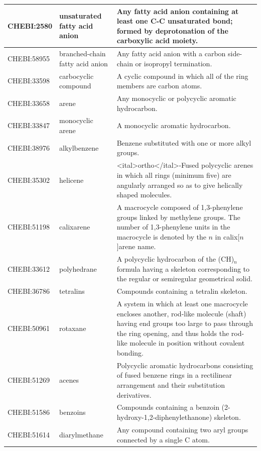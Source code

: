 \documentclass[10pt]{bmc_article}
\newenvironment{bmcformat}{\baselineskip20pt\sloppy\setboolean{publ}{false}}{\baselineskip20pt\sloppy}
\begin{document}
\begin{bmcformat}
{\begin{tabular}{|l|l|p{8cm}|}
CHEBI:2580  &  unsaturated fatty acid anion  &  Any fatty acid anion containing at least one C-C unsaturated bond; formed by deprotonation of the carboxylic acid moiety. \\ \hline
CHEBI:58955  &  branched-chain fatty acid anion  &  Any fatty acid anion with a carbon side-chain or isopropyl termination. \\ \hline
CHEBI:33598  &  carbocyclic compound  &  A cyclic compound in which all of the ring members are carbon atoms.\\ \hline
CHEBI:33658  &  arene  &  Any monocyclic or polycyclic aromatic hydrocarbon. \\ \hline
CHEBI:33847  &  monocyclic arene  &  A monocyclic aromatic hydrocarbon. \\ \hline
CHEBI:38976  &  alkylbenzene  &  Benzene substituted with one or more alkyl groups. \\ \hline
CHEBI:35302  &  helicene  &  <ital>ortho</ital>-Fused polycyclic arenes in which all rings (minimum five) are angularly arranged so as to give helically shaped molecules. \\ \hline
CHEBI:51198  &  calixarene  &  A macrocycle composed of 1,3-phenylene groups linked by methylene groups. The number of 1,3-phenylene units in the macrocycle is denoted by the $n$ in calix[$n$]arene name. \\ \hline
CHEBI:33612  &  polyhedrane  &  A polycyclic hydrocarbon of the (CH)$_n$ formula having a skeleton corresponding to the regular or semiregular geometrical solid. \\ \hline
CHEBI:36786  &  tetralins  &  Compounds containing a tetralin skeleton.\\ \hline
CHEBI:50961  &  rotaxane  &  A system in which at least one macrocycle encloses another, rod-like molecule (shaft) having end groups too large to pass through the ring opening, and thus holds the rod-like molecule in position without covalent bonding. \\ \hline
CHEBI:51269  &  acenes  &  Polycyclic aromatic hydrocarbons consisting of fused benzene rings in a rectilinear arrangement and their substitution derivatives. \\ \hline
CHEBI:51586  &  benzoins  &  Compounds containing a benzoin (2-hydroxy-1,2-diphenylethanone) skeleton. \\ \hline
CHEBI:51614  &  diarylmethane  &  Any compound containing two aryl groups connected by a single C atom. \\ \hline
      \end{tabular}
      } 




\end{bmcformat}
\end{document}

